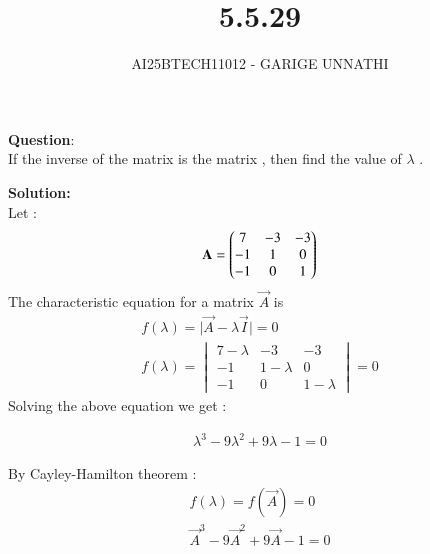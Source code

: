 \documentclass[journal]{IEEEtran}
\begin{document}



\title{5.5.29}
\author{AI25BTECH11012 - GARIGE UNNATHI}
{\let\newpage\relax\maketitle}


\renewcommand{\thefigure}{\theenumi}
\renewcommand{\thetable}{\theenumi}
\setlength{\intextsep}{10pt} %



\vspace{-1cm}

\textbf{Question}:\\
If the inverse of the matrix is the matrix  , then find the value of $\lambda$ .


\textbf{Solution: }\\
Let : 
\begin{align*}
    \mathbf{A}  = \begin{pmatrix}7 &-3&-3\\
                      -1&1&0\\
                      -1&0&1\end{pmatrix}
\end{align*}
The characteristic equation for a matrix $\vec{A}$ is  
\begin{align}
 f(\lambda) =  \lvert \vec{A} - \lambda\vec{I} \rvert = 0\\
 f(\lambda) = \begin{vmatrix}7-\lambda &-3&-3\\
                      -1&1-\lambda&0\\
                      -1&0&1-\lambda\end{vmatrix} = 0
\end{align}
Solving the above equation we get :

\begin{align}
  \lambda^3 - 9\lambda^2 + 9\lambda - 1 = 0
\end{align}

By Cayley-Hamilton theorem :
\begin{align}
  f(\lambda) = f(\vec{A}) = 0 \\
  \vec{A}^3 -9\vec{A}^2 + 9\vec{A} -1 =0
\end{align}
\end{document}

